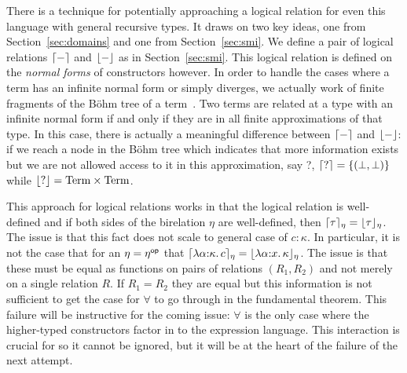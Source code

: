 There is a technique for potentially approaching a logical relation
for even this language with general recursive types. It draws on two
key ideas, one from Section~\ref{sec:domains} and one from
Section~\ref{sec:smi}. We define a pair of logical relations
$\lceil - \rceil$ and $\lfloor - \rfloor$ as in Section~\ref{sec:smi}. This
logical relation is defined on the \emph{normal forms} of
constructors however. In order to handle the cases where a term has an
infinite normal form or simply diverges, we actually work of finite
fragments of the B\"ohm tree of a term~\citep{TODO-BOHM}. Two terms
are related at a type with an infinite normal form if and only if they
are in all finite approximations of that type. In this case, there is
actually a meaningful difference between $\lceil - \rceil$ and
$\lfloor - \rfloor$: if we reach a node in the B\"ohm tree which indicates
that more information exists but we are not allowed access to it in
this approximation, say ?, $\lceil ? \rceil = \{(\bot, \bot)\}$ while
$\lfloor ? \rfloor = \mathrm{Term} \times \mathrm{Term}$.

This approach for logical relations works in that the logical relation
is well-defined and if both sides of the birelation $\eta$ are
well-defined, then $\lceil \tau \rceil_\eta =
\lfloor \tau \rfloor_\eta$. The issue is that this fact does not scale to
general case of $c : \kappa$. In particular, it is not the case that
for an $\eta = \eta^{\mathsf{op}}$ that
$\lceil \lambda \alpha {:} \kappa.\, c \rceil_\eta = \lfloor \lambda \alpha {:} x.\, \kappa \rfloor_\eta$.
The issue is that these must be equal as functions on pairs of
relations $(R_1, R_2)$ and not merely on a single relation $R$. If
$R_1 = R_2$ they are equal but this information is not sufficient to
get the case for $\forall$ to go through in the fundamental
theorem. This failure will be instructive for the coming issue:
$\forall$ is the only case where the higher-typed constructors factor
in to the expression language. This interaction is crucial for
\citet{TODO-POTTIER} so it cannot be ignored, but it will be at the
heart of the failure of the next attempt.

